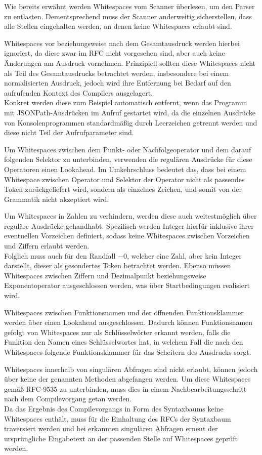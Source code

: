 \documentclass[oneside]{ausarbeitung}
\begin{document}
Wie bereits erwähnt werden Whitespaces vom Scanner überlesen, um den Parser zu entlasten. Dementsprechend muss der Scanner anderweitig sicherstellen, dass alle Stellen eingehalten werden, an denen keine Whitespaces erlaubt sind.

Whitespaces vor beziehungsweise nach dem Gesamtausdruck werden hierbei ignoriert, da diese zwar im RFC nicht vorgesehen sind, aber auch keine Änderungen am Ausdruck vornehmen. Prinzipiell sollten diese Whitespaces nicht als Teil des Gesamtausdrucks betrachtet werden, insbesondere bei einem normalisierten Ausdruck, jedoch wird ihre Entfernung bei Bedarf auf den aufrufenden Kontext des Compilers ausgelagert. \\
Konkret werden diese zum Beispiel automatisch entfernt, wenn das Programm mit JSONPath-Ausdrücken im Aufruf gestartet wird, da die einzelnen Ausdrücke von Konsolenprogrammen standardmäßig durch Leerzeichen getrennt werden und diese nicht Teil der Aufrufparameter sind.

Um Whitespaces zwischen dem Punkt- oder Nachfolgeoperator und dem darauf folgenden Selektor zu unterbinden, verwenden die regulären Ausdrücke für diese Operatoren einen Lookahead. Im Umkehrschluss bedeutet das, dass bei einem Whitespace zwischen Operator und Selektor der Operator nicht als passendes Token zurückgeliefert wird, sondern als einzelnes Zeichen, und somit von der Grammatik nicht akzeptiert wird.

Um Whitespaces in Zahlen zu verhindern, werden diese auch weitestmöglich über reguläre Ausdrücke gehandhabt. Spezifisch werden Integer hierfür inklusive ihrer eventuellen Vorzeichen definiert, sodass keine Whitespaces zwischen Vorzeichen und Ziffern erlaubt werden. \\
Folglich muss auch für den Randfall $-0$, welcher eine Zahl, aber kein Integer darstellt, dieser als gesondertes Token betrachtet werden. Ebenso müssen Whitespaces zwischen Ziffern und Dezimalpunkt beziehungsweise Exponentoperator ausgeschlossen werden, was über Startbedingungen realisiert wird.

Whitespaces zwischen Funktionsnamen und der öffnenden Funktionsklammer werden über einen Lookahead ausgeschlossen. Dadurch können Funktionsnamen gefolgt von Whitespaces nur als Schlüsselwörter erkannt werden, falls die Funktion den Namen eines Schlüsselwortes hat, in welchem Fall die nach den Whitespaces folgende Funktionsklammer für das Scheitern des Ausdrucks sorgt.

\pagebreak

Whitespaces innerhalb von singulären Abfragen sind nicht erlaubt, können jedoch über keine der genannten Methoden abgefangen werden. Um diese Whitespaces gemäß RFC-9535 zu unterbinden, muss dies in einem Nachbearbeitungsschritt nach dem Compilevorgang getan werden. \\
Da das Ergebnis des Compilevorgangs in Form des Syntaxbaums keine Whitespaces enthält, muss für die Einhaltung des RFCs der Syntaxbaum traversiert werden und bei erkannten singulären Abfragen erneut der ursprüngliche Eingabetext an der passenden Stelle auf Whitespaces geprüft werden.
\end{document}
